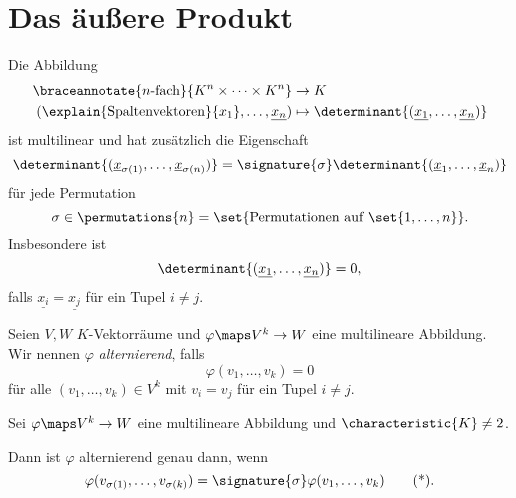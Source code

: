 \section{Das äußere Produkt}
\begin{beispiel*}
  Die Abbildung
  \begin{align*}
    \braceannotate{\text{\( n \)-fach}}{K^n\times\dotsb\times K^n}&\to K\\
    (\explain{\text{Spaltenvektoren}}{x_1},\dotsc,\underline{x_n})&\mapsto \determinant{(\underline{x_1},\dotsc,\underline{x_n})}
  \end{align*}
  ist multilinear und hat zusätzlich die Eigenschaft
  \begin{equation*}
    \determinant{(\underline{x}_{\sigma(1)},\dotsc,\underline{x}_{\sigma(n)})}=\signature{\sigma}\determinant{(\underline{x}_1,\dotsc,\underline{x}_n)}
  \end{equation*}
  für jede Permutation
  \begin{equation*}
    \sigma\in \permutations{n}=\set{\text{Permutationen auf \( \set{1,\dotsc,n} \)}}.
  \end{equation*}
  Insbesondere ist
  \begin{equation*}
    \determinant{(\underline{x_1},\dotsc,\underline{x_n})}=0,
  \end{equation*}
  falls \( \underline{x_i}=\underline{x_j} \) für ein Tupel \( i\neq j \).
\end{beispiel*}
\begin{definition*}
  Seien \( V,W \) \( K \)-Vektorräume und \( \varphi\maps V^k\to W\) eine multilineare Abbildung. Wir nennen \( \varphi \) \emph{alternierend}, falls
  \begin{equation*}
    \varphi(v_1,\dotsc,v_k)=0
  \end{equation*}
  für alle \( (v_1,\dotsc,v_k)\in V^k \) mit \( v_i=v_j \) für ein Tupel \( i\neq j \).
\end{definition*}
\begin{lemma}
  Sei \( \varphi\maps V^k\to W \) eine multilineare Abbildung und \( \characteristic{K}\neq 2 \).

  Dann ist \( \varphi \) alternierend genau dann, wenn
  \begin{equation*}
    \varphi(v_{\sigma(1)},\dotsc,v_{\sigma(k)})=\signature{\sigma}\varphi(v_1,\dotsc,v_k)\tag{*}\label{eq:alternierend_alt_definition}.
  \end{equation*}
\end{lemma}
